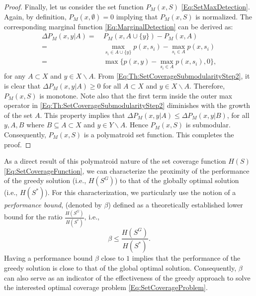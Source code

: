 \documentclass[letterpaper, 10 pt, conference]{ieeeconf}
\begin{document}
\begin{proof}
Finally, let us consider the set function $P_M(x,S)$ \eqref{Eq:SetMaxDetection}. Again, by definition, $P_M(x,\emptyset) = 0$ implying that $P_M(x,S)$ is normalized. The corresponding marginal function \eqref{Eq:MarginalDetection} can be derived as:
\begin{align}
\Delta P_M(x,y \vert A) =&\ P_M(x,A\cup\{y\}) - P_M(x,A) \nonumber\\    
=&\ \max_{s_i\in A\cup\{y\}} p(x,s_i) - \max_{s_i\in A} p(x,s_i)\nonumber\\
=&\ \max\{p(x,y)-\max_{s_i\in A} p(x,s_i),0\}, \label{Eq:Th:SetCoverageSubmodularityStep2}
\end{align}
for any $A \subset X$ and $y\in X\backslash A$. From \eqref{Eq:Th:SetCoverageSubmodularityStep2}, it is clear that $\Delta P_M(x,y \vert A) \geq 0$ for all $A \subset X$ and $y\in X\backslash A$. Therefore, $P_M(x,S)$ is monotone. Note also that the first term inside the outer max operator in \eqref{Eq:Th:SetCoverageSubmodularityStep2} diminishes with the growth of the set $A$. This property implies that $\Delta P_M(x,y \vert A) \leq \Delta P_M(x,y \vert B)$, for all $y,A,B$ where $B \subseteq A \subset X$ and $y \in Y\backslash A$. Hence $P_M(x,S)$ is submodular. Consequently, $P_M(x,S)$ is a polymatroid set function. This completes the proof.
\end{proof}


As a direct result of this polymatroid nature of the set coverage function $H(S)$ \eqref{Eq:SetCoverageFunction}, we can characterize the proximity of the performance of the greedy solution (i.e., $H(S^G)$) to that of the globally optimal solution (i.e., $H(S^*)$). For this characterization, we particularly use the notion of a \emph{performance bound}, (denoted by $\beta$) defined as a theoretically established lower bound for the ratio $\frac{H(S^G)}{H(S^*)}$, i.e., 
\begin{equation}\label{Eq:Def:PerformanceBound}
    \beta \leq \frac{H(S^G)}{H(S^*)}.
\end{equation}
Having a performance bound $\beta$ close to $1$ implies that the performance of the greedy solution is close to that of the global optimal solution. Consequently, $\beta$ can also serve as an indicator of the effectiveness of the greedy approach to solve the interested optimal coverage problem \eqref{Eq:SetCoverageProblem}.   
\end{document}
